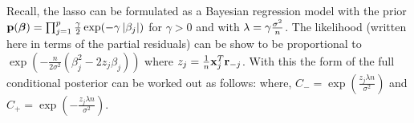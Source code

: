 Recall, the lasso can be formulated as a Bayesian regression model with the prior $\mathbf{p}(\boldsymbol{\beta}) = \prod_{j = 1}^{p} \frac{\gamma}{2}\exp(-\gamma \left\lvert\beta_j\right\rvert)$ for $\gamma > 0$ and with $\lambda = \gamma \frac{\sigma^2}{n}$. The likelihood (written here in terms of the partial residuals) can be show to be proportional to $\exp(-\frac{n}{2\sigma^2} (\beta_j^2 - 2z_j\beta_j))$ where $z_{j} = \frac{1}{n} \mathbf{x}_{j}^{T}\mathbf{r}_{-j}$.   With this the form of the full conditional posterior can be worked out as follows:
where, $C_{-} = \exp(\frac{z_j \lambda n}{\sigma^2})$ and $C_{+} = \exp(-\frac{z_j \lambda n}{\sigma^2})$.

